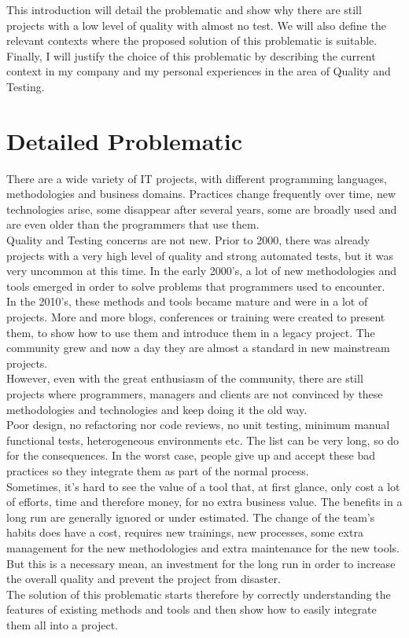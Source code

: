 This introduction will detail the problematic and show why there are
still projects with a low level of quality with almost no test.
We will also define the relevant contexts where the proposed solution
of this problematic is suitable.
Finally, I will justify the choice of this problematic by describing the
current context in my company and my personal experiences in the area of
Quality and Testing.
\section{Detailed Problematic}\label{sec:detailed-problematic}
There are a wide variety of IT projects, with different programming
languages, methodologies and business domains.
Practices change frequently over time, new technologies arise,
some disappear after several years, some are broadly used and are even older
than the programmers that use them. \\
Quality and Testing concerns are not new.
Prior to 2000, there was already projects with a very high level of quality
and strong automated tests, but it was very uncommon at this time.
In the early 2000's, a lot of new methodologies and tools emerged in order
to solve problems that programmers used to encounter. \\
In the 2010's, these methods and tools became mature and were in a
lot of projects.
More and more blogs, conferences or training were created to present them,
to show how to use them and introduce them in a legacy project.
The community grew and now a day they are almost a standard in new mainstream
projects. \\
\newline
However, even with the great enthusiasm of the community, there are still
projects where programmers, managers and clients are not convinced by
these methodologies and technologies and keep doing it the old way. \\
Poor design, no refactoring nor code reviews, no unit testing, minimum
manual functional tests, heterogeneous environments etc.
The list can be very long, so do for the consequences.
In the worst case, people give up and accept these bad practices so they
integrate them as part of the normal process. \\
Sometimes, it's hard to see the value of a tool that, at first glance, only
cost a lot of
efforts, time and therefore money, for no extra business value.
The benefits in a long run are generally ignored or under estimated.
The change of the team's habits does have a cost, requires new trainings,
new processes, some extra management for the new methodologies and
extra maintenance for the new tools.
But this is a necessary mean, an investment for the long run in order to
increase the overall quality and prevent the project from disaster. \\
\newline
The solution of this problematic starts therefore by correctly understanding
the features of existing methods and tools and then show how to easily
integrate them all into a project.

